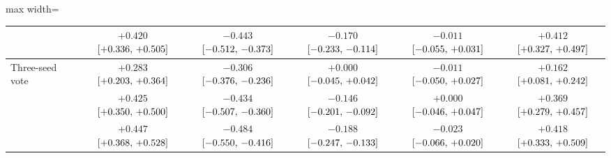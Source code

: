 \begin{table}[!htbp]
\begin{adjustbox}{max width=\linewidth}
\begin{tabular}{ll ccccc}
 & \gpt{} & $+0.420$ $[+0.336,\,+0.505]$ & $-0.443$ $[-0.512,\,-0.373]$ & $-0.170$ $[-0.233,\,-0.114]$ & $-0.011$ $[-0.055,\,+0.031]$ & $+0.412$ $[+0.327,\,+0.497]$ \\
\midrule
Three-seed vote & \gem{} & $+0.283$ $[+0.203,\,+0.364]$ & $-0.306$ $[-0.376,\,-0.236]$ & $+0.000$ $[-0.045,\,+0.042]$ & $-0.011$ $[-0.050,\,+0.027]$ & $+0.162$ $[+0.081,\,+0.242]$ \\
 & \opus{} & $+0.425$ $[+0.350,\,+0.500]$ & $-0.434$ $[-0.507,\,-0.360]$ & $-0.146$ $[-0.201,\,-0.092]$ & $+0.000$ $[-0.046,\,+0.047]$ & $+0.369$ $[+0.279,\,+0.457]$ \\
 & \gpt{} & $+0.447$ $[+0.368,\,+0.528]$ & $-0.484$ $[-0.550,\,-0.416]$ & $-0.188$ $[-0.247,\,-0.133]$ & $-0.023$ $[-0.066,\,+0.020]$ & $+0.418$ $[+0.333,\,+0.509]$ \\
\bottomrule
\end{tabular}
\end{adjustbox}
\end{table}

